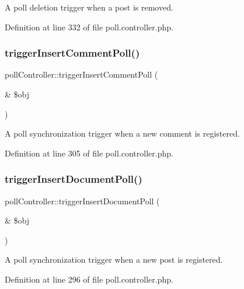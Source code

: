 A poll deletion trigger when a post is removed. 



Definition at line 332 of file poll.\+controller.\+php.

\mbox{\label{classpollController_a9676dc5c2762bf1c7818828d6ccf3efa}} 
\subsubsection{\texorpdfstring{trigger\+Insert\+Comment\+Poll()}{triggerInsertCommentPoll()}}
{\footnotesize\ttfamily poll\+Controller\+::trigger\+Insert\+Comment\+Poll (\begin{DoxyParamCaption}\item[{\&}]{\$obj }\end{DoxyParamCaption})}



A poll synchronization trigger when a new comment is registered. 



Definition at line 305 of file poll.\+controller.\+php.

\mbox{\label{classpollController_ae2ad5e6f6c89c2aee07208a8a66ef5e7}} 
\subsubsection{\texorpdfstring{trigger\+Insert\+Document\+Poll()}{triggerInsertDocumentPoll()}}
{\footnotesize\ttfamily poll\+Controller\+::trigger\+Insert\+Document\+Poll (\begin{DoxyParamCaption}\item[{\&}]{\$obj }\end{DoxyParamCaption})}



A poll synchronization trigger when a new post is registered. 



Definition at line 296 of file poll.\+controller.\+php.

